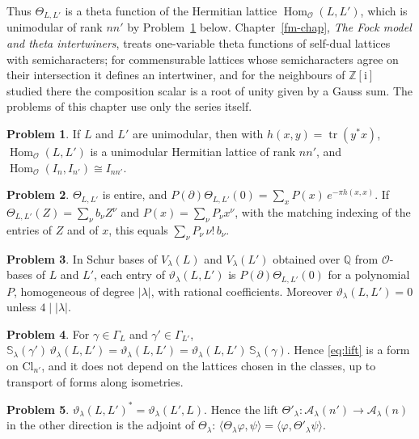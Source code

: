 \documentclass[reqno]{amsart}
\newcounter{chap}
\theoremstyle{definition}
\newtheorem{problem}{Problem}[section]
\theoremstyle{plain}
\newcommand{\Z}{\mathbb{Z}}
\newcommand{\Q}{\mathbb{Q}}
\newcommand{\ii}{\mathrm{i}}
\newcommand{\Oc}{\mathcal{O}}
\newcommand{\Sc}{\mathbb{S}}
\newcommand{\Ac}{\mathcal{A}}
\newcommand{\Cl}{\mathrm{Cl}}
\newcommand{\Hom}{\operatorname{Hom}}
\newcommand{\tr}{\operatorname{tr}}
\begin{document}
Thus \(\Theta_{L,L'}\) is a theta function of the Hermitian lattice \(\Hom_\Oc(L,L')\), which is unimodular of rank \(nn'\) by Problem~\ref{pr:hom} below.  Chapter~\ref{fm-chap}, \emph{The Fock model and theta intertwiners}, treats one-variable theta functions of self-dual lattices with semicharacters; for commensurable lattices whose semicharacters agree on their intersection it defines an intertwiner, and for the neighbours of \(\Z[\ii]\) studied there the composition scalar is a root of unity given by a Gauss sum.  The problems of this chapter use only the series itself.

\begin{problem}\label{pr:hom}
If \(L\) and \(L'\) are unimodular, then with \(h(x,y) = \tr(y^*x)\), \(\Hom_\Oc(L, L')\) is a unimodular Hermitian lattice of rank \(nn'\), and \(\Hom_\Oc(I_n, I_{n'}) \cong I_{nn'}\).
\end{problem}

\begin{problem}\label{pr:jet}
\(\Theta_{L,L'}\) is entire, and \(P(\partial)\Theta_{L,L'}(0) = \sum_x P(x)\, e^{-\pi h(x,x)}\).  If \(\Theta_{L,L'}(Z) = \sum_\nu b_\nu Z^\nu\) and \(P(x) = \sum_\nu P_\nu x^\nu\), with the matching indexing of the entries of \(Z\) and of \(x\), this equals \(\sum_\nu P_\nu\, \nu!\, b_\nu\).
\end{problem}

\begin{problem}\label{pr:entries}
In Schur bases of \(V_\lambda(L)\) and \(V_\lambda(L')\) obtained over \(\Q\) from \(\Oc\)-bases of \(L\) and \(L'\), each entry of \(\vartheta_\lambda(L,L')\) is \(P(\partial)\Theta_{L,L'}(0)\) for a polynomial \(P\), homogeneous of degree \(\lvert\lambda\rvert\), with rational coefficients.  Moreover \(\vartheta_\lambda(L, L') = 0\) unless \(4 \mid \lvert\lambda\rvert\).
\end{problem}

\begin{problem}\label{pr:equiv}
For \(\gamma \in \Gamma_L\) and \(\gamma' \in \Gamma_{L'}\), \(\Sc_\lambda(\gamma')\, \vartheta_\lambda(L,L') = \vartheta_\lambda(L,L') = \vartheta_\lambda(L,L')\, \Sc_\lambda(\gamma)\).  Hence \eqref{eq:lift} is a form on \(\Cl_{n'}\), and it does not depend on the lattices chosen in the classes, up to transport of forms along isometries.
\end{problem}

\begin{problem}\label{pr:adjoint}
\(\vartheta_\lambda(L,L')^* = \vartheta_\lambda(L',L)\).  Hence the lift \(\Theta'_\lambda \colon \Ac_\lambda(n') \to \Ac_\lambda(n)\) in the other direction is the adjoint of \(\Theta_\lambda\): \(\langle \Theta_\lambda \varphi, \psi \rangle = \langle \varphi, \Theta'_\lambda \psi \rangle\).
\end{problem}
\end{document}
